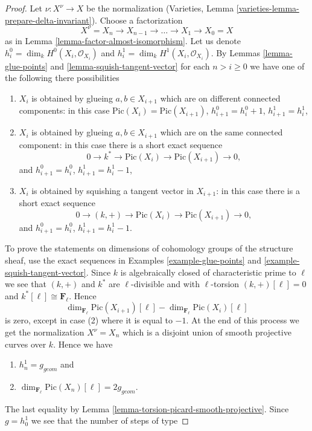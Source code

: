 \begin{proof}
Let $\nu : X^\nu \to X$ be the normalization
(Varieties, Lemma \ref{varieties-lemma-prepare-delta-invariant}).
Choose a factorization
$$
X^\nu = X_n \to X_{n - 1} \to \ldots \to X_1 \to X_0 = X
$$
as in Lemma \ref{lemma-factor-almost-isomorphism}.
Let us denote $h^0_i = \dim_k H^0(X_i, \mathcal{O}_{X_i})$
and $h^1_i = \dim_k H^1(X_i, \mathcal{O}_{X_i})$.
By Lemmas \ref{lemma-glue-points} and \ref{lemma-squish-tangent-vector}
for each $n > i \geq 0$ we have
one of the following there possibilities
\begin{enumerate}
\item $X_i$ is obtained by glueing $a, b \in X_{i + 1}$
which are on different connected components: in this case
$\text{Pic}(X_i) = \text{Pic}(X_{i + 1})$,
$h^0_{i + 1} = h^0_i + 1$, $h^1_{i + 1} = h^1_i$,
\item $X_i$ is obtained by glueing $a, b \in X_{i + 1}$
which are on the same connected component: in this case
there is a short exact sequence
$$
0 \to k^* \to \text{Pic}(X_i) \to \text{Pic}(X_{i + 1}) \to 0,
$$
and $h^0_{i + 1} = h^0_i$, $h^1_{i + 1} = h^1_i - 1$,
\item $X_i$ is obtained by squishing a tangent vector in $X_{i + 1}$:
in this case there is a short exact sequence
$$
0 \to (k, +) \to \text{Pic}(X_i) \to \text{Pic}(X_{i + 1}) \to 0,
$$
and $h^0_{i + 1} = h^0_i$, $h^1_{i + 1} = h^1_i - 1$.
\end{enumerate}
To prove the statements on dimensions of cohomology groups of the
structure sheaf, use the exact sequences in
Examples \ref{example-glue-points} and \ref{example-squish-tangent-vector}.
Since $k$ is algebraically closed of characteristic prime to $\ell$
we see that $(k, +)$ and $k^*$ are $\ell$-divisible and with
$\ell$-torsion $(k, +)[\ell] = 0$ and $k^*[\ell] \cong \mathbf{F}_\ell$.
Hence
$$
\dim_{\mathbf{F}_\ell} \text{Pic}(X_{i + 1})[\ell] -
\dim_{\mathbf{F}_\ell}\text{Pic}(X_i)[\ell]
$$
is zero, except in case (2) where it is equal to $-1$.
At the end of this process we get the normalization
$X^\nu = X_n$ which is a disjoint union of smooth projective
curves over $k$. Hence we have
\begin{enumerate}
\item $h^1_n = g_{geom}$ and
\item $\dim_{\mathbf{F}_\ell} \text{Pic}(X_n)[\ell] = 2g_{geom}$.
\end{enumerate}
The last equality by Lemma \ref{lemma-torsion-picard-smooth-projective}.
Since $g = h^1_0$ we see that the number of steps of type

\end{proof}
